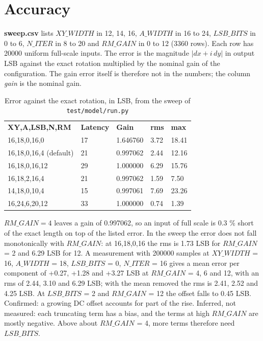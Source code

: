 \documentclass[a4paper, 12pt, notitlepage]{report}
\newcommand{\file}[1]{\textbf{#1}}
\begin{document}
\section{Accuracy}
\label{sec:pipe_acc}
\file{sweep.csv} lists $XY\_WIDTH$ in 12, 14, 16, $A\_WIDTH$ in 16 to 24, $LSB\_BITS$ in 0 to 6,
$N\_ITER$ in 8 to 20 and $RM\_GAIN$ in 0 to 12 (3360 rows). Each row has 20000 uniform
full-scale inputs. The error is the magnitude $|dx + i\,dy|$ in output LSB against the exact
rotation multiplied by the nominal gain of the configuration. The gain error itself is
therefore not in the numbers; the column \emph{gain} is the nominal gain.
\begin{table}[htbp]
   \center\small
   \begin{tabular}{@{}lllll@{}}
      \rowcolor{tableheadcolor}\textbf{XY,A,LSB,N,RM} & \textbf{Latency} & \textbf{Gain} & \textbf{rms} & \textbf{max} \\
      16,18,0,16,0   & 17 & 1.646760 & 3.72 & 18.41 \\\midrule
      16,18,0,16,4 (default) & 21 & 0.997062 & 2.44 & 12.16 \\\midrule
      16,18,0,16,12  & 29 & 1.000000 & 6.29 & 15.76 \\\midrule
      16,18,2,16,4   & 21 & 0.997062 & 1.59 & 7.50 \\\midrule
      14,18,0,10,4   & 15 & 0.997061 & 7.69 & 23.26 \\\midrule
      16,24,6,20,12  & 33 & 1.000000 & 0.74 & 1.39 \\
      \bottomrule
   \end{tabular}
   \caption{Error against the exact rotation, in LSB, from the sweep of \texttt{test/model/run.py}}
   \label{tab:pipe_acc}
\end{table}
$RM\_GAIN = 4$ leaves a gain of 0.997062, so an input of full scale is 0.3 \% short of the
exact length on top of the listed error. In the sweep the error does not fall monotonically with $RM\_GAIN$: at 16,18,0,16 the rms is 1.73 LSB for $RM\_GAIN$ = 2 and 6.29 LSB for 12.
A measurement with 200000 samples at $XY\_WIDTH$ = 16, $A\_WIDTH$ = 18, $LSB\_BITS$ = 0, $N\_ITER$ = 16 gives a mean
error per component of +0.27, +1.28 and +3.27 LSB at $RM\_GAIN$ = 4, 6 and 12, with an rms of 2.44, 3.10 and 6.29 LSB;
with the mean removed the rms is 2.41, 2.52 and 4.25 LSB. At $LSB\_BITS$ = 2 and $RM\_GAIN$ = 12 the offset falls to
0.45 LSB. Confirmed: a growing DC offset accounts for part of the rise. Inferred, not measured: each truncating term
has a bias, and the terms at high $RM\_GAIN$ are mostly negative. Above about $RM\_GAIN$ = 4, more terms therefore need
$LSB\_BITS$.
\end{document}
